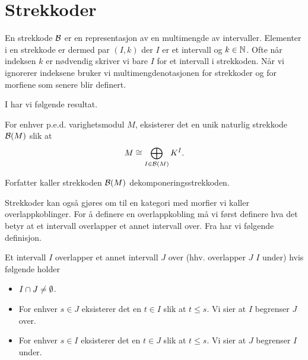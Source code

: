 \section{Strekkoder}\label{sek:Barc}
En strekkode $\mathcal{B}$ er en representasjon av en multimengde
av intervaller. Elementer i en strekkode er dermed par
$(I,k)$ der $I$ er et intervall og $k\in\mathbb{N}$. Ofte når
indeksen $k$ er nødvendig skriver vi bare $I$ for et
intervall i strekkoden. Når vi ignorerer indeksene bruker vi multimengdenotasjonen for
strekkoder og for morfiene som senere blir definert.

I \citep[teorem 2.4]{Bauer2020} har vi følgende resultat.
\begin{teorem}\label{trm:DekompBark}
  For enhver p.e.d. varighetsmodul $M$, eksisterer det en
  unik naturlig strekkode $\mathcal{B}(M)$ slik at
  \[M\cong \bigoplus_{I\in\mathcal{B}(M)} K^I.\]
\end{teorem}
Forfatter kaller strekkoden $\mathcal{B}(M)$
dekomponeringsstrekkoden.

%

Strekkoder kan også gjøres om til en kategori med morfier
vi kaller overlappkoblinger. For å definere en overlappkobling
må vi først definere hva det betyr at et intervall
overlapper et annet intervall over. Fra \citep[seksjon
2.3]{Bauer2020}
har vi følgende definisjon.

\begin{definisjon}
    Et intervall $I$ overlapper et annet intervall $J$
    over (hhv. overlapper $J$  $I$ under) hvis følgende
    holder
    \begin{itemize}
        \item $I\cap J\neq\emptyset$.
        \item For enhver $s\in J$ eksisterer det en $t\in I$ slik at $t\leq s$. Vi sier at $I$ begrenser $J$ over.
        \item For enhver $s\in I$ eksisterer det en $t\in J$ slik at $t\leq s$. Vi sier at $J$ begrenser $I$ under.
    \end{itemize}
\end{definisjon}

